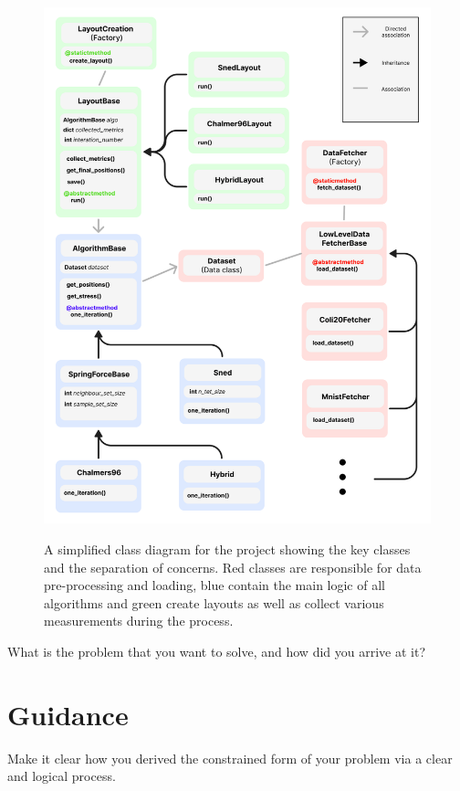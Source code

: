 \documentclass{l4proj}
\begin{document}
\begin{figure}[htb]
    \centering
    \includegraphics[width=1\linewidth]{images/class diag.png} \\
 
    \caption{A simplified class diagram for the project showing the key classes and the separation of concerns. Red classes are responsible for data pre-processing and loading, blue contain the main logic of all algorithms and green create layouts as well as collect various measurements during the process.
    }

    \label{fig:uml} 
\end{figure}





What is the problem that you want to solve, and how did you arrive at it?
\section{Guidance}
Make it clear how you derived the constrained form of your problem via a clear and logical process. 
\end{document}

